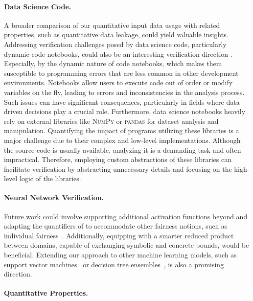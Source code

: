 \paragraph{Data Science Code.}

A broader comparison of our quantitative input data usage with related properties, such as quantitative data leakage, could yield valuable insights.
Addressing verification challenges posed by data science code, particularly dynamic code notebooks, could also be an interesting verification direction .
Especially, by the dynamic nature of code notebooks, which makes them susceptible to programming errors that are less common in other development environments.
Notebooks allow users to execute code out of order or modify variables on the fly, leading to errors and inconsistencies in the analysis process.
Such issues can have significant consequences, particularly in fields where data-driven decisions play a crucial role.
Furthermore, data science notebooks heavily rely on external libraries like \textsc{NumPy} or \textsc{pandas} for dataset analysis and manipulation.
Quantifying the impact of programs utilizing these libraries is a major challenge due to their complex and low-level implementations.
Although the source code is usually available, analyzing it is a demanding task and often impractical.
Therefore, employing custom abstractions of these libraries can facilitate verification by abstracting unnecessary details and focusing on the high-level logic of the libraries.

\paragraph{Neural Network Verification.}

Future work could involve supporting additional activation functions beyond \relu{} and adapting the quantifiers of \libra{} to accommodate other fairness notions, such as individual fairness~.
Additionally, equipping \libra{} with a smarter reduced product between domains, capable of exchanging symbolic and concrete bounds, would be beneficial.
Extending our approach to other machine learning models, such as support vector machines~ or decision tree ensembles~, is also a promising direction.


\paragraph{Quantitative Properties.}


